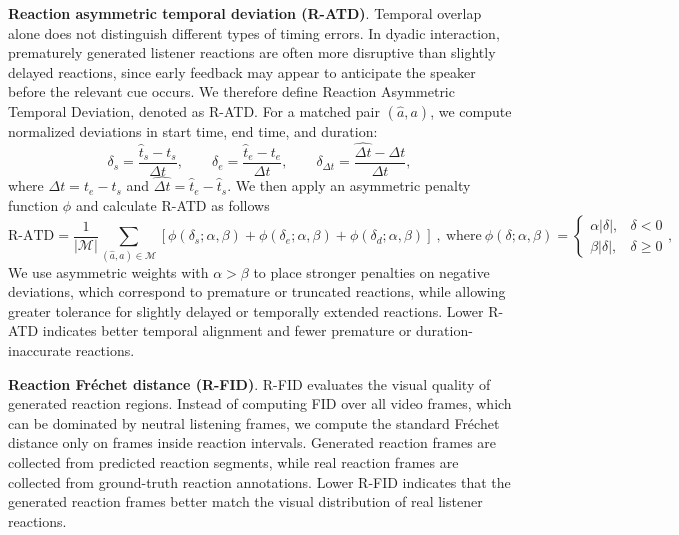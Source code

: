 \textbf{Reaction asymmetric temporal deviation (R-ATD)}. Temporal overlap alone does not distinguish different types of timing errors. In dyadic interaction, prematurely generated listener reactions are often more disruptive than slightly delayed reactions, since early feedback may appear to anticipate the speaker before the relevant cue occurs. 
We therefore define Reaction Asymmetric Temporal Deviation, denoted as R-ATD. For a matched pair $(\widehat{a},a)$, we compute normalized deviations in start time, end time, and duration:
{
\footnotesize
\begin{equation}
    \delta_s=\frac{\widehat{t}_s-t_s}{\Delta t}, \qquad
    \delta_e=\frac{\widehat{t}_e-t_e}{\Delta t}, \qquad
    \delta_{\Delta t}=\frac{\widehat{\Delta t}-\Delta t}{\Delta t},
\end{equation}
}where $\Delta t=t_e-t_s$ and $\widehat{\Delta t}=\widehat{t}_e-\widehat{t}_s$. We then apply an asymmetric penalty function $\phi$ and calculate R-ATD as follows
{
\footnotesize
\begin{equation}
    \text{R-ATD}=\frac{1}{|\mathcal{M}|}\sum_{(\widehat{a},a)\in\mathcal{M}}
    \left[\phi(\delta_s;\alpha,\beta)+\phi(\delta_e;\alpha,\beta)+\phi(\delta_d;\alpha,\beta)\right]
    \ ,\ \text{where}\ 
    \phi(\delta;\alpha,\beta)=
    \begin{cases}
        \alpha|\delta|, & \delta<0 \\
        \beta|\delta|, & \delta\geq0
    \end{cases},
\end{equation}
}We use asymmetric weights with $\alpha>\beta$
to place stronger penalties on negative deviations, which correspond to premature or truncated reactions, while allowing greater tolerance for slightly delayed or temporally extended reactions. Lower R-ATD indicates better temporal alignment and fewer premature or duration-inaccurate reactions.

\textbf{Reaction Fréchet distance (R-FID)}. R-FID evaluates the visual quality of generated reaction regions. Instead of computing FID over all video frames, which can be dominated by neutral listening frames, we compute the standard Fréchet distance only on frames inside reaction intervals. Generated reaction frames are collected from predicted reaction segments, while real reaction frames are collected from ground-truth reaction annotations. Lower R-FID indicates that the generated reaction frames better match the visual distribution of real listener reactions.

